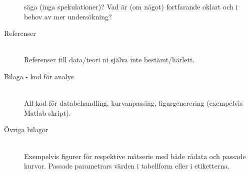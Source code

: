 \begin{description}
    säga (inga spekulationer)? Vad är (om något) fortfarande oklart och i
    behov av mer undersökning?
  \item[Referenser] \hfill \\
    Referenser till data/teori ni själva inte bestämt/härlett.
  \item[Bilaga - kod för analys] \hfill \\
    All kod för databehandling, kurvanpassing, figurgenerering (exempelvis
    Matlab skript).
  \item[Övriga bilagor] \hfill \\
    Exempelvis figurer för respektive mätserie med både rådata och
    passade kurvor. Passade parametrars värden i tabellform eller i
    etiketterna.
\end{description}

